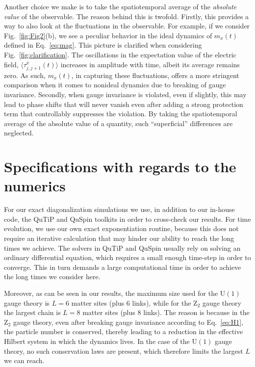 \documentclass[aps,prl,reprint,twocolumn,superscriptaddress,floatfix,nofootinbib]{revtex4-1}
\begin{document}
Another choice we make is to take the spatiotemporal average of the \emph{absolute value} of the observable. The reason behind this is twofold. Firstly, this provides a way to also look at the fluctuations in the observable. For example, if we consider Fig.~\ref{fig:Fig2}(b), we see a peculiar behavior in the ideal dynamics of $m_x(t)$ defined in Eq.~\eqref{eq:mag}. This picture is clarified when considering Fig.~\ref{fig:clarification}. The oscillations in the expectation value of the electric field, $\langle\tau_{j,j+1}^x(t)\rangle$ increases in amplitude with time, albeit its average remains zero. As such, $m_x(t)$, in capturing these fluctuations, offers a more stringent comparison when it comes to nonideal dynamics due to breaking of gauge invariance. Secondly, when gauge invariance is violated, even if slightly, this may lead to phase shifts that will never vanish even after adding a strong protection term that controllably suppresses the violation. By taking the spatiotemporal average of the absolute value of a quantity, such ``superficial'' differences are neglected.

\section{Specifications with regards to the numerics}
For our exact diagonalization simulations we use, in addition to our in-house code, the QuTiP \cite{Johansson2012-S,Johansson2013-S} and QuSpin \cite{Weinberg2017-S,Weinberg2019-S} toolkits in order to cross-check our results. For time evolution, we use our own exact exponentiation routine, because this does not require an iterative calculation that may hinder our ability to reach the long times we achieve. The solvers in QuTiP and QuSpin usually rely on solving an ordinary differential equation, which requires a small enough time-step in order to converge. This in turn demands a large computational time in order to achieve the long times we consider here.

Moreover, as can be seen in our results, the maximum size used for the $\mathrm{U}(1)$ gauge theory is $L=6$ matter sites (plus $6$ links), while for the $\mathrm{Z}_2$ gauge theory the largest chain is $L=8$ matter sites (plus $8$ links). The reason is because in the $\mathrm{Z}_2$ gauge theory, even after breaking gauge invariance according to Eq.~\eqref{eq:H1}, the particle number is conserved, thereby leading to a reduction in the effective Hilbert system in which the dynamics lives. In the case of the $\mathrm{U}(1)$ gauge theory, no such conservation laws are present, which therefore limits the largest $L$ we can reach.
\end{document}
